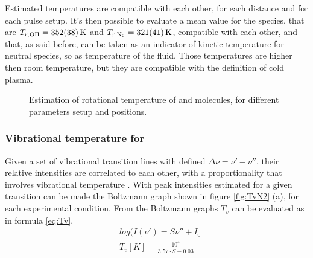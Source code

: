 Estimated temperatures are compatible with each other, for each distance and for each pulse setup. It's then possible to evaluate a mean value for the species, that are $T_{r,\ce{OH}} = \SI{352(38)}{\kelvin}$ and $T_{r,\ce{N2}} = \SI{321(41)}{\kelvin}$, compatible with each other, and that, as said before, can be taken as an indicator of kinetic temperature for neutral species, so as temperature of the fluid. Those temperatures are higher then room temperature, but they are compatible with the definition of cold plasma.
\begin{figure}
\centering
  \hfill
 \caption{Estimation of rotational temperature of  and  molecules, for different parameters setup and positions.}
 \label{fig:Trval}
\end{figure}

\subsubsection{Vibrational temperature for }
Given a set of vibrational transition lines with defined $\Delta \nu = \nu' - \nu''$, their relative intensities are correlated to each other, with a proportionality that involves vibrational temperature \cite{Britun_2007}.
With peak intensities estimated for a given transition can be made the Boltzmann graph shown in figure \ref{fig:TvN2} (a), for each experimental condition. From the Boltzmann graphs $T_v$ can be evaluated as in formula \ref{eq:Tv}.
\begin{equation}
 \begin{split}
  & log(I(\nu') = S \nu'' + I_0 \\
  & T_v [K] = \frac{10^4}{3.57 \cdot S - 0.03}
 \end{split}
\label{eq:Tv}
\end{equation}


